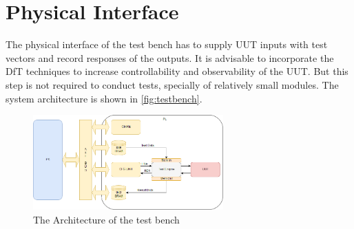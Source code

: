 \section{Physical Interface}
The physical interface of the test bench has to supply UUT inputs with test vectors and record responses of the outputs. It is advisable to incorporate the DfT techniques to increase controllability and observability of the UUT. But this step is not required to conduct tests, specially of relatively small modules. The system architecture is shown in \autoref{fig:testbench}.

\begin{figure}[H]
\centering
\includegraphics[width=0.65\textwidth]{figures/TestBench.png}
\caption{The Architecture of the test bench~\cite{book:ZynqBook}}
\label{fig:testbench}
\end{figure}



